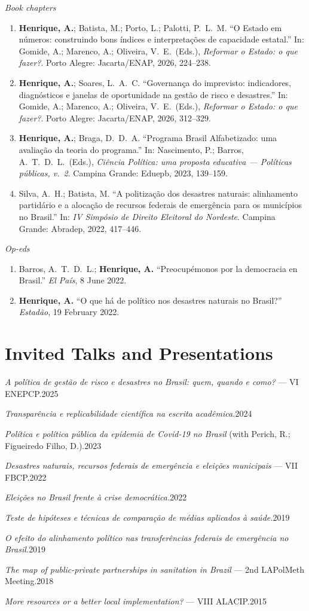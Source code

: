 \documentclass[11pt]{article}
\newcommand{\cvsubsection}[1]{\vspace{0.3em}\textit{#1}\par\vspace{0.1em}}
\newcommand{\entryplain}[2]{\noindent#1\hfill #2\par}
\begin{document}
\cvsubsection{Book chapters}
\begin{enumerate}[leftmargin=0.3in,itemsep=0.35em,parsep=0pt]
\item \textbf{Henrique, A.}; Batista, M.; Porto, L.; Palotti, P.\ L.\ M. ``O Estado em números: construindo bons índices e interpretações de capacidade estatal.'' In: Gomide, A.; Marenco, A.; Oliveira, V.\ E.\ (Eds.), \textit{Reformar o Estado: o que fazer?}. Porto Alegre: Jacarta/ENAP, 2026, 224--238.
\item \textbf{Henrique, A.}; Soares, L.\ A.\ C. ``Governança do imprevisto: indicadores, diagnósticos e janelas de oportunidade na gestão de risco e desastres.'' In: Gomide, A.; Marenco, A.; Oliveira, V.\ E.\ (Eds.), \textit{Reformar o Estado: o que fazer?}. Porto Alegre: Jacarta/ENAP, 2026, 312--329.
\item \textbf{Henrique, A.}; Braga, D.\ D.\ A. ``Programa Brasil Alfabetizado: uma avaliação da teoria do programa.'' In: Nascimento, P.; Barros, A.\ T.\ D.\ L.\ (Eds.), \textit{Ciência Política: uma proposta educativa --- Políticas públicas, v.\ 2}. Campina Grande: Eduepb, 2023, 139--159.
\item Silva, A.\ H.; Batista, M. ``A politização dos desastres naturais: alinhamento partidário e a alocação de recursos federais de emergência para os municípios no Brasil.'' In: \textit{IV Simpósio de Direito Eleitoral do Nordeste}. Campina Grande: Abradep, 2022, 417--446.
\end{enumerate}

\cvsubsection{Op-eds}
\begin{enumerate}[leftmargin=0.3in,itemsep=0.35em,parsep=0pt]
\item Barros, A.\ T.\ D.\ L.; \textbf{Henrique, A.} ``Preocupémonos por la democracia en Brasil.'' \textit{El País}, 8 June 2022.
\item \textbf{Henrique, A.} ``O que há de político nos desastres naturais no Brasil?'' \textit{Estadão}, 19 February 2022.
\end{enumerate}

\section{Invited Talks and Presentations}

\entryplain{\textit{A política de gestão de risco e desastres no Brasil: quem, quando e como?} --- VI ENEPCP.}{2025}
\entryplain{\textit{Transparência e replicabilidade científica na escrita acadêmica.}}{2024}
\entryplain{\textit{Política e política pública da epidemia de Covid-19 no Brasil} (with Perich, R.; Figueiredo Filho, D.).}{2023}
\entryplain{\textit{Desastres naturais, recursos federais de emergência e eleições municipais} --- VII FBCP.}{2022}
\entryplain{\textit{Eleições no Brasil frente à crise democrática.}}{2022}
\entryplain{\textit{Teste de hipóteses e técnicas de comparação de médias aplicados à saúde.}}{2019}
\entryplain{\textit{O efeito do alinhamento político nas transferências federais de emergência no Brasil.}}{2019}
\entryplain{\textit{The map of public-private partnerships in sanitation in Brazil} --- 2nd LAPolMeth Meeting.}{2018}
\entryplain{\textit{More resources or a better local implementation?} --- VIII ALACIP.}{2015}
\end{document}
